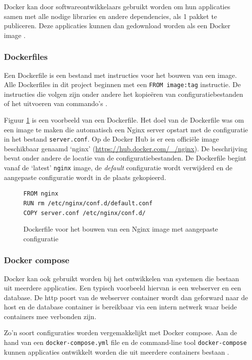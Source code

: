 \documentclass[a4paper,12pt]{report}
\begin{document}
Docker kan door softwareontwikkelaars gebruikt worden om hun applicaties samen met alle nodige libraries en andere dependencies, als 1 pakket te publiceren.
Deze applicaties kunnen dan gedownload worden als een Docker image \autocite{docker:containers}.

\subsubsection{Dockerfiles}
Een Dockerfile is een bestand met instructies voor het bouwen van een image.
Alle Dockerfiles in dit project beginnen met een \lstinline|FROM image:tag| instructie.
De instructies die volgen zijn onder andere het kopieëren van configuratiebestanden of het uitvoeren van commando's \autocite{docker:dockerfile}.

Figuur \ref{fig:dockerfile-example} is een voorbeeld van een Dockerfile.
Het doel van de Dockerfile was om een image te maken die automatisch een Nginx server opstart met de configuratie in het bestand \lstinline|server.conf|.
Op de Docker Hub is er een officiële image beschikbaar genaamd `nginx' (\url{https://hub.docker.com/_/nginx}).
De beschrijving bevat onder andere de locatie van de configuratiebestanden.
De Dockerfile begint vanaf de `latest' \lstinline|nginx| image, de \emph{default} configuratie wordt verwijderd en de aangepaste configuratie wordt in de plaats gekopieerd.

\begin{figure}[H]
  \begin{lstlisting}
FROM nginx
RUN rm /etc/nginx/conf.d/default.conf
COPY server.conf /etc/nginx/conf.d/
  \end{lstlisting}
  \caption{Dockerfile voor het bouwen van een Nginx image met aangepaste configuratie}
  \label{fig:dockerfile-example}
\end{figure}

\subsubsection{Docker compose}
Docker kan ook gebruikt worden bij het ontwikkelen van systemen die bestaan uit meerdere applicaties.
Een typisch voorbeeld hiervan is een webserver en een database.
De http poort van de webserver container wordt dan geforward naar de host en de database container is bereikbaar via een intern netwerk waar beide containers mee verbonden zijn.

Zo'n soort configuraties worden vergemakkelijkt met Docker compose.
Aan de hand van een \lstinline|docker-compose.yml| file en de command-line tool \lstinline|docker-compose| kunnen applicaties ontwikkelt worden die uit meerdere containers bestaan \autocite{docker:compose}.
\end{document}

